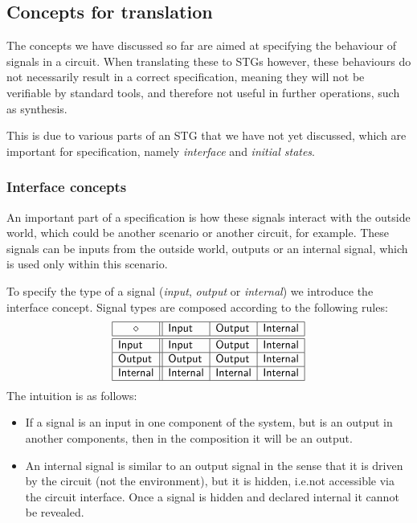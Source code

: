 \documentclass[british,conference,compsoc]{IEEEtran}
\begin{document}

\subsection{Concepts for translation\label{sub:trans-concepts}}

The concepts we have discussed so far are aimed at specifying the behaviour of signals in a circuit.
When translating these to STGs however, these behaviours do not necessarily result in a correct
specification, meaning they will not be verifiable by standard tools, and therefore not useful in 
further operations, such as synthesis.

This is due to various parts of an STG that we have not yet discussed, which are important
for specification, namely \emph{interface} and \emph{initial states}.


\subsubsection{Interface concepts\label{sub:interface}} 

An important part of a specification is how these signals interact with the outside world, which could
be another scenario or another circuit, for example. These signals can be inputs from the outside world,
outputs or an internal signal, which is used only within this scenario. 

To specify the type of a signal (\emph{input},
\emph{output} or \emph{internal}) we introduce the \textsf{interface} concept.
Signal types are composed according to the following rules:
\[
\begin{array}{|l||l|l|l|}
\hline
\multicolumn{1}{|c||}{\diamond} & \mathsf{Input} & \mathsf{Output} &
\mathsf{Internal} \\ \hline \hline
\mathsf{Input} & \mathsf{Input} & \mathsf{Output} & \mathsf{Internal} \\ \hline
\mathsf{Output} & \mathsf{Output} & \mathsf{Output} & \mathsf{Internal} \\
\hline
\mathsf{Internal}& \mathsf{Internal} & \mathsf{Internal} & \mathsf{Internal} \\
\hline
\end{array}
\]
The intuition is as follows:
\begin{itemize}
    \item If a signal is an input in one component of the system, but is an
    output in another components, then in the composition it will be an output.
    \item An internal signal is similar to an output signal in the sense
that it is driven by the circuit (not the environment), but it is hidden, i.e.not accessible via the circuit interface. Once a signal is hidden and declared    internal it cannot be revealed.
\end{itemize}
\end{document}
